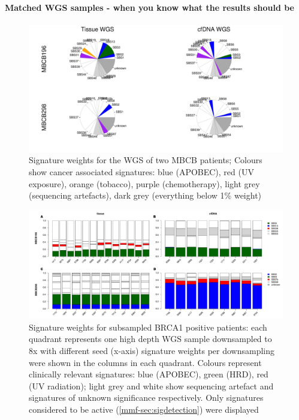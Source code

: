 


\paragraph{Matched WGS samples - when you know what the results should be}
\label{mmf-sec:matchedMBCB}

\begin{figure}[ht]
\centering
\includegraphics[width=.99\linewidth]{Figures/MisMatchFinder/mbcbWGSsignatures.pdf}
\caption[Signature weights for the WGS of two MBCB patients]{Signature weights for the WGS of two MBCB patients; Colours show cancer associated signatures: blue (APOBEC), red (UV exposure), orange (tobacco), purple (chemotherapy), light grey (sequencing artefacts), dark grey (everything below 1\% weight)}\label{fig:mmf-mbcbWGSsigPie}
\end{figure}
 
 
\begin{figure}[ht]
\centering
\includegraphics[width=.99\linewidth]{Figures/MisMatchFinder/brca1BarPlots.pdf}
\caption[Signature weights for subsampled BRCA1 positive patients]{Signature weights for subsampled BRCA1 positive patients: each quadrant represents one high depth WGS sample downsampled to 8x with different seed (x-axis) signature weights per downsampling were shown in the columns in each quadrant. Colours represent clinically relevant signatures: blue (APOBEC), green (HRD), red (UV radiation); light grey and white show sequencing artefact and signatures of unknown significance respectively. Only signatures considered to be active (\autoref{mmf-sec:sigdetection}) were displayed}\label{fig:mmf-mbcbBarPlot}
\end{figure}

